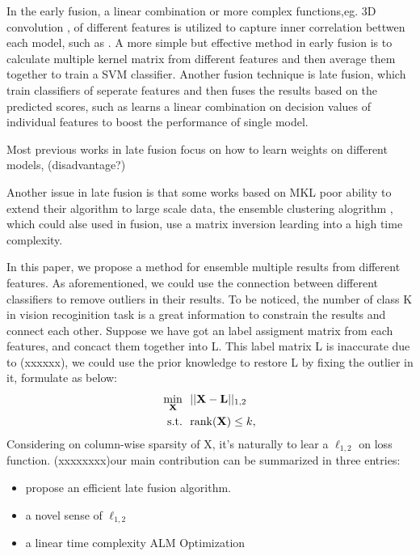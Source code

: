 \documentclass[letterpaper]{article}
\def\bL{{\bf L}}
\def\bX{{\bf X}}
\def\bX{{\bf X}}
\def\st{{\text{s.t.}}}
\def\rank{{\text{rank}}}
\begin{document}
In the early fusion, a linear combination or more complex functions,eg. 3D convolution , of different features is utilized to capture inner correlation bettwen each model, such as \cite{Feichtenhofer2016Convolutional}. A more simple but effective method in early fusion is to calculate multiple kernel matrix from different features and then average them together to train a SVM classifier.
Another fusion technique is late fusion, which train classifiers of seperate features and then fuses the results based on the predicted scores, such as \cite{gehler2009feature} learns a linear combination on decision values of individual features to boost the performance of single model.

Most previous works in late fusion focus on how to learn weights on different models, (disadvantage?)

Another issue in late fusion is that some works based on MKL \cite{xuiccv2013feature} poor ability to extend their algorithm to large scale data, the ensemble clustering alogrithm \cite{gaoijcai2016robust}, which could alse used in fusion, use a matrix inversion learding into a high time complexity.

In this paper, we propose a method for ensemble multiple results from different features. As aforementioned, we could use the connection between different classifiers to remove outliers in their results. To be noticed, the number of class K in vision recoginition task is a great information to constrain the results and connect each other. Suppose we have got an label assigment matrix from each features, and concact them together into L. This label matrix L is inaccurate due to (xxxxxx), we could use the prior knowledge to restore L by fixing the outlier in it, formulate as below:
\begin{align}\label{eq:typical_mc}
  \min_{\bX} ~&~ || \bX - \bL ||_{1,2}   \nonumber \\
  \st        ~&~ \rank(\bX) \leq k  ,
\end{align}
\noindent
Considering on column-wise sparsity of X, it's naturally to lear a $\ell_{1,2}$ on loss function.
(xxxxxxxx)our main contribution can be summarized in three entries:
\begin{itemize}
  \item propose an efficient late fusion algorithm.
  \item a novel sense of $\ell_{1,2}$
  \item a linear time complexity ALM Optimization
\end{itemize}
\end{document}
